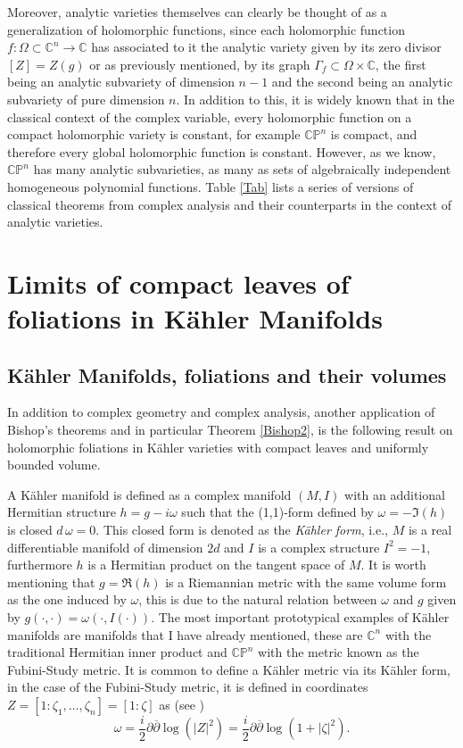 \documentclass{article}
\newcommand{\co}{\ensuremath{\mathbb C }}
\newcommand{\con}{\ensuremath{\mathbb{C}^n}}
\newcommand{\cp}{\ensuremath{\mathbb{CP}}}
\begin{document}
Moreover, analytic varieties themselves can clearly be thought of as a generalization of holomorphic functions,
since each holomorphic function $f:\Omega\subset\con\rightarrow\co$ has associated to it the analytic variety given by its zero divisor $[Z]=Z(g)$
or as previously mentioned, by its graph $\Gamma_{f}\subset\Omega\times\co$, the first being an analytic subvariety of
dimension $n-1$ and the second being
an analytic subvariety of pure dimension $n$. In addition to this, it is widely known that in the classical context
of the complex variable, every holomorphic function on a compact holomorphic variety is constant, for example $\cp^n$ is compact,
and therefore every global holomorphic function is constant. However, as we know, $\cp^n$ has many analytic subvarieties, as many
as sets of algebraically independent homogeneous polynomial functions. Table \ref{Tab} lists a series of
versions of classical theorems from complex analysis and their counterparts in the context of analytic varieties.

\section{Limits of compact leaves of foliations in K\"ahler Manifolds}
\subsection{K\"ahler Manifolds, foliations and their volumes}
\noindent In addition to complex geometry and complex analysis, another application of Bishop's theorems and in particular Theorem
\ref{Bishop2}, is the following result on holomorphic foliations in K\"ahler varieties with compact leaves and uniformly bounded volume.

A K\"ahler manifold is defined as a complex manifold $(M,I)$ with an additional Hermitian structure $h=g-i\omega$ such that the (1,1)-form defined by $\omega=-\Im (h)$ is closed $d\,\omega=0$. This closed form is denoted as the \emph{K\"ahler form}, i.e., $M$ is a real differentiable manifold of dimension $2d$ and
$I$ is a complex structure $I^2=-1$, furthermore $h$ is a Hermitian product on the tangent space of $M$.
It is worth mentioning that $g=\Re (h)$ is a Riemannian metric with the same volume form as the one induced by $\omega$, this is due to the natural relation between $\omega$ and $g$ given by $g(\cdot,\cdot)=\omega(\cdot,I(\cdot))$. The most important prototypical examples of K\"ahler manifolds are manifolds that I have already mentioned, these are $\con$ with the traditional Hermitian inner product and $\cp^{n}$ with the metric known as the Fubini-Study metric.
It is common to define a K\"ahler metric via its K\"ahler form, in the case of the Fubini-Study metric, it is defined in coordinates $Z=[1:\zeta_{1},\dots,\zeta_{n}]=[1:\zeta]$ as (see \cite[p. 154]{Chirka})
\[
    \omega=\frac{i}{2}\partial\overline{\partial}\log(|Z|^{2})=\frac{i}{2}\partial\overline{\partial}\log(1+|\zeta|^{2}).
\]
\end{document}
